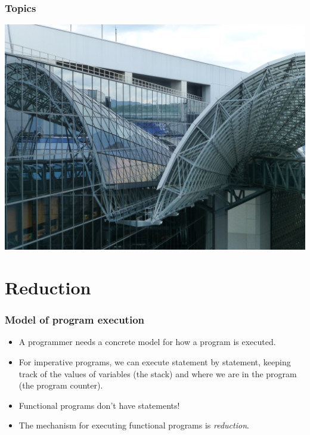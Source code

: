 \documentclass{beamer}
\begin{document}
\begin{frame}[fragile]
  \PresentationTitleSlide
\end{frame}

\begin{frame}[fragile]
  \frametitle{Topics}
  \tableofcontents
\end{frame}
\begin{frame}[fragile]
\begin{center}
\includegraphics[scale=0.35]
    {figures/jpg/pic02.jpg}
\end{center}
\end{frame}

\section{Reduction}

\begin{frame}[fragile]
\frametitle{Model of program execution}

\begin{itemize}
\item A programmer needs a concrete model for how a program is
  executed.
\item For imperative programs, we can execute statement by
  statement, keeping track of the values of variables (the stack)
  and where we are in the program (the program counter).
\item Functional programs don't have statements!
\item The mechanism for executing functional programs is
  \emph{reduction}.
\end{itemize}

\end{frame}
\end{document}
